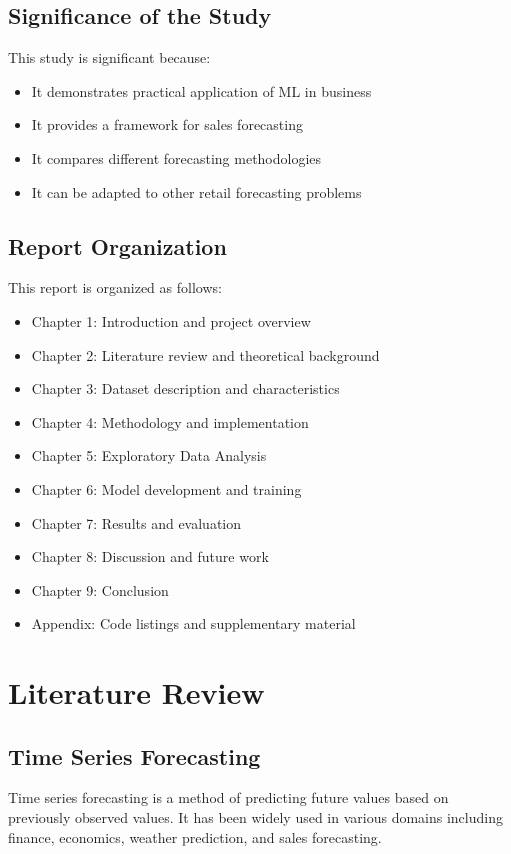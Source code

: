 \documentclass[12pt,a4paper]{report}
\begin{document}
\section{Significance of the Study}
This study is significant because:
\begin{itemize}
    \item It demonstrates practical application of ML in business
    \item It provides a framework for sales forecasting
    \item It compares different forecasting methodologies
    \item It can be adapted to other retail forecasting problems
\end{itemize}

\section{Report Organization}
This report is organized as follows:

\begin{itemize}
    \item Chapter 1: Introduction and project overview
    \item Chapter 2: Literature review and theoretical background
    \item Chapter 3: Dataset description and characteristics
    \item Chapter 4: Methodology and implementation
    \item Chapter 5: Exploratory Data Analysis
    \item Chapter 6: Model development and training
    \item Chapter 7: Results and evaluation
    \item Chapter 8: Discussion and future work
    \item Chapter 9: Conclusion
    \item Appendix: Code listings and supplementary material
\end{itemize}

\chapter{Literature Review}
\label{ch:literature}

\section{Time Series Forecasting}
\label{sec:ts_overview}
Time series forecasting is a method of predicting future values based on previously observed values. It has been widely used in various domains including finance, economics, weather prediction, and sales forecasting.
\end{document}
